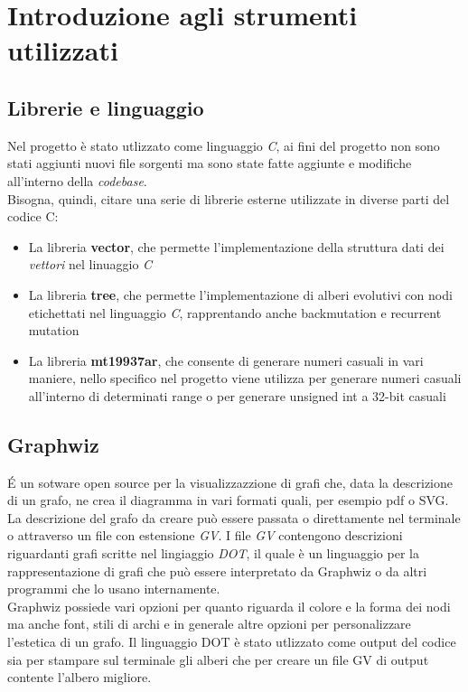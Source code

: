 \documentclass{report}
\begin{document}
  \section{Introduzione agli strumenti utilizzati}
  \subsection{Librerie e linguaggio}

  Nel progetto è stato utlizzato come linguaggio \emph{C}, ai fini del progetto non sono stati aggiunti nuovi file sorgenti ma sono state fatte aggiunte e modifiche all'interno della \textit{codebase}.\\
  Bisogna, quindi, citare una serie di librerie esterne utilizzate in diverse parti del codice C:
  \begin{itemize}
    \item La libreria \textbf{vector}, che permette l'implementazione della struttura dati dei \textit{vettori} nel linuaggio \textit{C}

    \item La libreria \textbf{tree}, che permette l'implementazione di alberi evolutivi con nodi etichettati nel linguaggio \textit{C}, rapprentando anche backmutation e recurrent mutation

    \item La libreria \textbf{mt19937ar}, che consente di generare numeri casuali in vari maniere, nello specifico nel progetto viene utilizza per generare numeri casuali all'interno di determinati range o per generare unsigned int a 32-bit casuali
  \end{itemize}

  \subsection{Graphwiz}
  \'E un sotware open source per la visualizzazzione di grafi che, data la descrizione di un grafo, ne crea il diagramma in vari formati quali, per esempio pdf o SVG.
  La descrizione del grafo da creare può essere passata o direttamente nel terminale o attraverso un file con estensione \emph{GV}.
  I file \emph{GV} contengono descrizioni riguardanti grafi scritte nel lingiaggio \emph{DOT}, il quale è un linguaggio per la rappresentazione di grafi che può essere interpretato da Graphwiz o da altri programmi che lo usano internamente.\\
  Graphwiz possiede vari opzioni per quanto riguarda il colore e la forma dei nodi ma anche font, stili di archi e in generale altre opzioni per personalizzare l'estetica di un grafo. Il linguaggio DOT è stato utlizzato come output del codice sia per stampare sul terminale gli alberi che per creare un file GV di output contente l'albero migliore.
\end{document}

